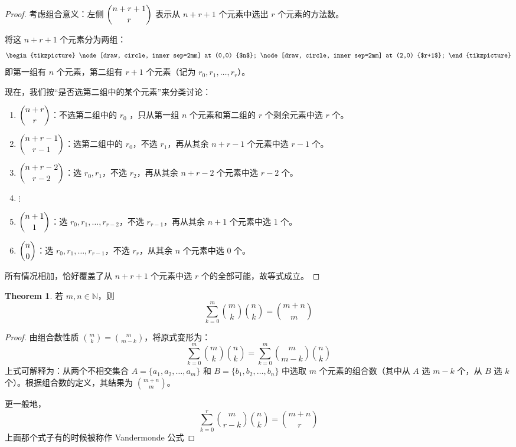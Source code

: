 \documentclass[oneside]{book}
\theoremstyle{definition}
\newtheorem{theorem}{Theorem}[section]
\begin{document}
\begin{proof}
	考虑组合意义：左侧 \( \dbinom{n+r+1}{r} \) 表示从 \( n+r+1 \) 个元素中选出 \( r \) 个元素的方法数。
	
	将这 \( n+r+1 \) 个元素分为两组：
	\[
	\begin{tikzpicture}
		\node[draw, circle, inner sep=2mm] at (0,0) {$n$};
		\node[draw, circle, inner sep=2mm] at (2,0) {$r+1$};
	\end{tikzpicture}
	\]
	即第一组有 \( n \) 个元素，第二组有 \( r+1 \) 个元素（记为 \( r_0, r_1, \dots, r_r \)）。
	
	现在，我们按“是否选第二组中的某个元素”来分类讨论：
	\begin{enumerate}
		\item \( \dbinom{n+r}{r} \)：不选第二组中的 \( r_0\) ，只从第一组 \( n \) 个元素和第二组的 \( r \) 个剩余元素中选 \( r \) 个。
		\item \( \dbinom{n+r-1}{r-1} \)：选第二组中的 \( r_0 \)，不选 \( r_1 \)，再从其余 \( n+r-1 \) 个元素中选 \( r-1 \) 个。
		\item \( \dbinom{n+r-2}{r-2} \)：选 \( r_0, r_1 \)，不选 \( r_2 \)，再从其余 \( n+r-2 \) 个元素中选 \( r-2 \) 个。
		\item \(\vdots\)
		\item \( \dbinom{n+1}{1} \)：选 \( r_0, r_1, \dots, r_{r-2} \)，不选 \( r_{r-1} \)，再从其余 \( n+1 \) 个元素中选 \( 1 \) 个。
		\item \( \dbinom{n}{0} \)：选 \( r_0, r_1, \dots, r_{r-1} \)，不选 \( r_r \)，从其余 \( n \) 个元素中选 \( 0 \) 个。
	\end{enumerate}
	
	所有情况相加，恰好覆盖了从 \( n+r+1 \) 个元素中选 \( r \) 个的全部可能，故等式成立。
\end{proof}


\begin{theorem}
	若 \( m,n \in \mathbb{N} \)，则 \[ \sum_{k=0}^{m}\binom{m}{k}\binom{n}{k} = \binom{m+n}{m} \]
\end{theorem}

\begin{proof}
	由组合数性质 \( \binom{m}{k} = \binom{m}{m-k} \)，将原式变形为：
	\[
	\sum_{k=0}^{m}\binom{m}{k}\binom{n}{k} = \sum_{k=0}^{m}\binom{m}{m-k}\binom{n}{k}
	\]
	上式可解释为：从两个不相交集合 \( A = \{a_1,a_2,\dots,a_m\} \) 和 \( B = \{b_1,b_2,\dots,b_n\} \) 中选取 \( m \) 个元素的组合数（其中从 \( A \) 选 \( m-k \) 个，从 \( B \) 选 \( k \) 个）。根据组合数的定义，其结果为 \( \binom{m+n}{m} \)。
	
	更一般地，\[\sum_{k=0}^{r}\binom{m}{r-k}\binom{n}{k}=\binom{m+n}{r}\]上面那个式子有的时候被称作 Vandermonde 公式
\end{proof}
\end{document}
